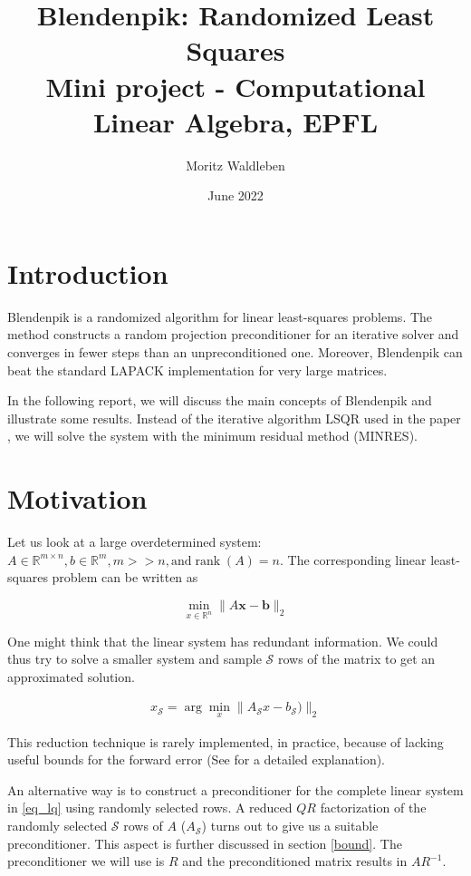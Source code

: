 \documentclass{article}
\title{Blendenpik: Randomized Least Squares \\[1ex] \large Mini project - Computational Linear Algebra, EPFL}
\author{Moritz Waldleben}
\date{June 2022}
\begin{document}
\maketitle

\section{Introduction} \label{intro}
Blendenpik \cite{blendenpik} is a randomized algorithm for linear
least-squares problems. The method constructs a random projection preconditioner
for an iterative solver and converges in fewer steps than an
unpreconditioned one. Moreover, Blendenpik can beat the standard LAPACK
implementation for very large matrices. 

In the following report, we will discuss the main concepts of Blendenpik and
illustrate some results. Instead of the iterative algorithm LSQR used
in the paper \cite{blendenpik}, we will solve the system with the minimum
residual method (MINRES).

\section{Motivation} \label{mot}
Let us look at a large overdetermined system: $A \in \mathbb{R}^{m \times n}, b
\in \mathbb{R}^{m}, m>>n, \text{and} \operatorname{rank}(A)=n$. The
corresponding linear least-squares problem can be written as

\begin{equation} \label{eq_lq}
	\min _{x \in \mathbb{R}^{n}}\|A \mathbf{x}-\mathbf{b}\|_{2}
\end{equation}

One might think that the linear system has redundant information. We could thus
try to solve a smaller system and sample $\mathcal{S}$ rows of the matrix to
get an approximated solution.

\begin{align*}
	x_{\mathcal{S}}=\arg \min _{x}\|A_\mathcal{S} x-b_\mathcal{S})\|_{2}
\end{align*}

This reduction technique is rarely implemented, in practice, because of lacking
useful bounds for the forward error (See \cite{blendenpik} for a detailed
explanation).

An alternative way is to construct a preconditioner for the complete linear
system in \ref{eq_lq} using randomly selected rows. A reduced $QR$
factorization of the randomly selected $\mathcal{S}$ rows of $A$
($A_\mathcal{S}$) turns out to give us a suitable preconditioner. This aspect
is further discussed in section \ref{bound}. The preconditioner we will use is
$R$ and the preconditioned matrix results in $AR^{-1}$.
\end{document}

